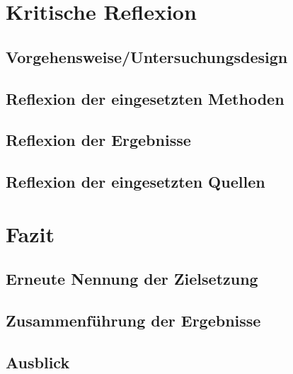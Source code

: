 \documentclass[../main.tex]{subfiles}
\begin{document}
  \section{Kritische Reflexion}

  \subsection{Vorgehensweise/Untersuchungsdesign}

  \subsection{Reflexion der eingesetzten Methoden}

  \subsection{Reflexion der Ergebnisse}

  \subsection{Reflexion der eingesetzten Quellen}

  \newpage
  \section{Fazit}

  \subsection{Erneute Nennung der Zielsetzung}

  \subsection{Zusammenführung der Ergebnisse}

  \subsection{Ausblick}
\end{document}
